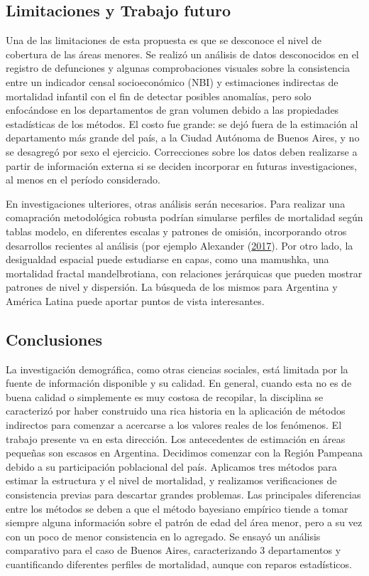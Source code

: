 \documentclass[12pt,]{article}
\begin{document}
\hypertarget{limitaciones-y-trabajo-futuro}{%
\subsection{Limitaciones y Trabajo
futuro}\label{limitaciones-y-trabajo-futuro}}

Una de las limitaciones de esta propuesta es que se desconoce el nivel
de cobertura de las áreas menores. Se realizó un análisis de datos
desconocidos en el registro de defunciones y algunas comprobaciones
visuales sobre la consistencia entre un indicador censal socioeconómico
(NBI) y estimaciones indirectas de mortalidad infantil con el fin de
detectar posibles anomalías, pero solo enfocándose en los departamentos
de gran volumen debido a las propiedades estadísticas de los métodos. El
costo fue grande: se dejó fuera de la estimación al departamento más
grande del país, a la Ciudad Autónoma de Buenos Aires, y no se desagregó
por sexo el ejercicio. Correcciones sobre los datos deben realizarse a
partir de información externa si se deciden incorporar en futuras
investigaciones, al menos en el período considerado.

En investigaciones ulteriores, otras análisis serán necesarios. Para
realizar una comapración metodológica robusta podrían simularse perfiles
de mortalidad según tablas modelo, en diferentes escalas y patrones de
omisión, incorporando otros desarrollos recientes al análisis (por
ejemplo Alexander (\protect\hyperlink{ref-Alexander2017}{2017}). Por
otro lado, la desigualdad espacial puede estudiarse en capas, como una
mamushka, una mortalidad fractal mandelbrotiana, con relaciones
jerárquicas que pueden mostrar patrones de nivel y dispersión. La
búsqueda de los mismos para Argentina y América Latina puede aportar
puntos de vista interesantes.

\hypertarget{conclusiones}{%
\subsection{Conclusiones}\label{conclusiones}}

La investigación demográfica, como otras ciencias sociales, está
limitada por la fuente de información disponible y su calidad. En
general, cuando esta no es de buena calidad o simplemente es muy costosa
de recopilar, la disciplina se caracterizó por haber construido una rica
historia en la aplicación de métodos indirectos para comenzar a
acercarse a los valores reales de los fenómenos. El trabajo presente va
en esta dirección. Los antecedentes de estimación en áreas pequeñas son
escasos en Argentina. Decidimos comenzar con la Región Pampeana debido a
su participación poblacional del país. Aplicamos tres métodos para
estimar la estructura y el nivel de mortalidad, y realizamos
verificaciones de consistencia previas para descartar grandes problemas.
Las principales diferencias entre los métodos se deben a que el método
bayesiano empírico tiende a tomar siempre alguna información sobre el
patrón de edad del área menor, pero a su vez con un poco de menor
consistencia en lo agregado. Se ensayó un análisis comparativo para el
caso de Buenos Aires, caracterizando 3 departamentos y cuantificando
diferentes perfiles de mortalidad, aunque con reparos estadísticos.
\end{document}
